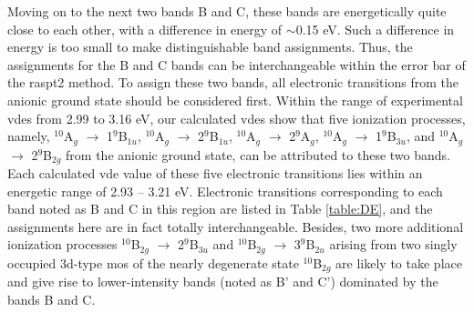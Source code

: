 \begin{refsection}
Moving on to the next two bands B and C, these bands are energetically quite close to each other, with a difference in energy of $\sim$0.15 eV. Such a difference in energy is too small to make distinguishable band assignments. Thus, the assignments for the B and C bands can be interchangeable within the error bar of the \acrshort{raspt2} method. To assign these two bands, all electronic transitions from the anionic ground state should be considered first. Within the range of experimental \acrshort{vde}s from 2.99 to 3.16 eV, our calculated \acrshort{vde}s show that five ionization processes, namely, $^{10}$A$_g$ $\longrightarrow$ 1$^9$B$_{1u}$, $^{10}$A$_g$ $\longrightarrow$ 2$^9$B$_{1u}$, $^{10}$A$_g$ $\longrightarrow$ 2$^9$A$_g$, $^{10}$A$_g$ $\longrightarrow$ 1$^9$B$_{3u}$, and $^{10}$A$_g$ $\longrightarrow$ 2$^9$B$_{2g}$ from the anionic ground state, can be attributed to these two bands. Each calculated \acrshort{vde} value of these five electronic transitions lies within an energetic range of 2.93 -- 3.21 eV. Electronic transitions corresponding to each band noted as B and C in this region are listed in Table \ref{table:DE}, and the assignments here are in fact totally interchangeable. Besides, two more additional ionization processes $^{10}$B$_{2g}$ $\longrightarrow$ 2$^9$B$_{3u}$ and $^{10}$B$_{2g}$ $\longrightarrow$ 3$^9$B$_{2u}$ arising from two singly occupied 3d-type \acrshort{mo}s of the nearly degenerate state $^{10}$B$_{2g}$ are likely to take place and give rise to lower-intensity bands (noted as B' and C') dominated by the bands B and C.





\end{refsection}

